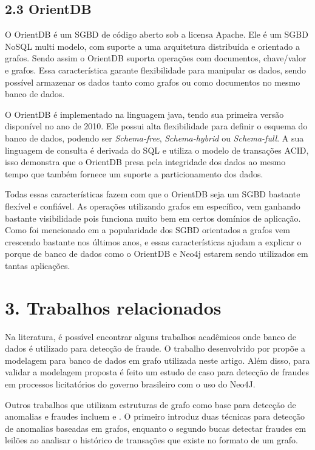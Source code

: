 \documentclass[12pt]{article}
\begin{document}
\subsection{2.3 OrientDB} \label{sec:orientDB}

O OrientDB é um SGBD de código aberto sob a licensa Apache. Ele é um SGBD NoSQL multi modelo, com suporte a uma arquitetura distribuída e orientado a grafos. Sendo assim o OrientDB suporta operações com documentos, chave/valor e grafos. Essa característica garante flexibilidade para manipular os dados, sendo possível armazenar os dados tanto como grafos ou como documentos no mesmo banco de dados. 

O OrientDB é implementado na linguagem java, tendo sua primeira versão disponível no ano de 2010. Ele possui alta flexibilidade para definir o esquema do banco de dados, podendo ser \textit{Schema-free}, \textit{Schema-hybrid} ou \textit{Schema-full}. A sua linguagem de consulta é derivada do SQL e utiliza o modelo de transações ACID, isso demonstra que o OrientDB presa pela integridade dos dados ao mesmo tempo que também fornece um suporte a particionamento dos dados.

Todas essas características fazem com que o OrientDB seja um SGBD bastante flexível e confiável. As operações utilizando grafos em específico, vem ganhando bastante visibilidade pois funciona muito bem em certos domínios de aplicação. Como foi mencionado em \cite{Graphpopularity} a popularidade dos SGBD orientados a grafos vem crescendo bastante nos últimos anos, e essas características ajudam a explicar o porque de banco de dados como o OrientDB e Neo4j estarem sendo utilizados em tantas aplicações.

\section{3. Trabalhos relacionados} \label{sec:relacionados}

Na literatura, é possível encontrar alguns trabalhos acadêmicos onde banco de dados é utilizado para detecção de fraude. O trabalho desenvolvido por \cite{van2017graph} propõe a modelagem para banco de dados em grafo utilizada neste artigo. Além disso, para validar a modelagem proposta é feito um estudo de caso para detecção de fraudes em processos licitatórios do governo brasileiro com o uso do Neo4J. 

Outros trabalhos que utilizam estruturas de grafo como base para detecção de anomalias e fraudes incluem \cite{noble2003graph} e \cite{chau2005fraud}. O primeiro introduz duas técnicas para detecção de anomalias baseadas em grafos, enquanto o segundo bucas detectar fraudes em leilões ao analisar o histórico de transações que existe no formato de um grafo.
\end{document}
